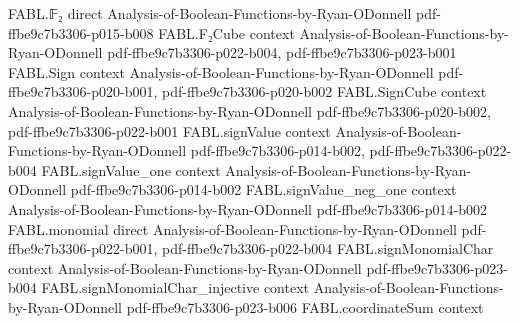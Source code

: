 \begin{theorem}
\label{FABL.composeThreeQuerySystem_acceptanceProbability_eq_one}
\leanok
{}
\proofstep
  {FABL.𝔽₂}
  {direct}
  {Analysis-of-Boolean-Functions-by-Ryan-ODonnell}
  {pdf-ffbe9c7b3306-p015-b008}
\proofstep
  {FABL.F₂Cube}
  {context}
  {Analysis-of-Boolean-Functions-by-Ryan-ODonnell}
  {pdf-ffbe9c7b3306-p022-b004,
    pdf-ffbe9c7b3306-p023-b001}
\proofstep
  {FABL.Sign}
  {context}
  {Analysis-of-Boolean-Functions-by-Ryan-ODonnell}
  {pdf-ffbe9c7b3306-p020-b001,
    pdf-ffbe9c7b3306-p020-b002}
\proofstep
  {FABL.SignCube}
  {context}
  {Analysis-of-Boolean-Functions-by-Ryan-ODonnell}
  {pdf-ffbe9c7b3306-p020-b002,
    pdf-ffbe9c7b3306-p022-b001}
\proofstep
  {FABL.signValue}
  {context}
  {Analysis-of-Boolean-Functions-by-Ryan-ODonnell}
  {pdf-ffbe9c7b3306-p014-b002,
    pdf-ffbe9c7b3306-p022-b004}
\proofstep
  {FABL.signValue_one}
  {context}
  {Analysis-of-Boolean-Functions-by-Ryan-ODonnell}
  {pdf-ffbe9c7b3306-p014-b002}
\proofstep
  {FABL.signValue_neg_one}
  {context}
  {Analysis-of-Boolean-Functions-by-Ryan-ODonnell}
  {pdf-ffbe9c7b3306-p014-b002}
\proofstep
  {FABL.monomial}
  {direct}
  {Analysis-of-Boolean-Functions-by-Ryan-ODonnell}
  {pdf-ffbe9c7b3306-p022-b001,
    pdf-ffbe9c7b3306-p022-b004}
\proofstep
  {FABL.signMonomialChar}
  {context}
  {Analysis-of-Boolean-Functions-by-Ryan-ODonnell}
  {pdf-ffbe9c7b3306-p023-b004}
\proofstep
  {FABL.signMonomialChar_injective}
  {context}
  {Analysis-of-Boolean-Functions-by-Ryan-ODonnell}
  {pdf-ffbe9c7b3306-p023-b006}
\proofstep
  {FABL.coordinateSum}
  {context}

\end{theorem}
